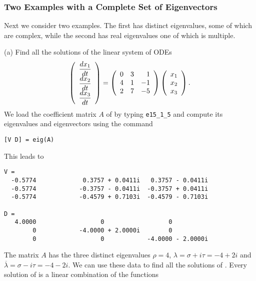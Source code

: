 \subsubsection*{Two Examples with a Complete Set of Eigenvectors}

Next we consider two examples.  The first has distinct eigenvalues, some 
of which are complex, while the second has real eigenvalues one of which is 
multiple.

\noindent (a)  Find all the solutions of the linear system of ODEs
\arraystart
\begin{equation*}  \label{eq:exsyslinc1}
\left(\begin{array}{c}
\displaystyle\frac{dx_1}{dt} \\ \displaystyle\frac{dx_2}{dt} \\ \displaystyle\frac{dx_3}{dt}
\end{array}\right)
=
\left(\begin{array}{rrr}
     0  &  3  &  1\\
     4  &  1  & -1\\
     2  &  7  & -5
\end{array}\right)
\left(\begin{array}{c}
x_1 \\ x_2 \\ x_3
\end{array}\right).
\end{equation*}
\arrayfinish
We load the coefficient matrix $A$ of  by typing 
{\tt e15\_1\_5} and compute its eigenvalues and eigenvectors using the 
command 
\begin{verbatim}
[V D] = eig(A)
\end{verbatim}
This leads to
\begin{verbatim}
V =
  -0.5774             0.3757 + 0.0411i   0.3757 - 0.0411i
  -0.5774            -0.3757 - 0.0411i  -0.3757 + 0.0411i
  -0.5774            -0.4579 + 0.7103i  -0.4579 - 0.7103i

D =
   4.0000                  0                  0
        0            -4.0000 + 2.0000i        0
        0                  0            -4.0000 - 2.0000i
\end{verbatim}
The matrix $A$ has the three distinct eigenvalues $\rho=4$,
$\lambda=\sigma+i\tau = -4+2i$ and $\overline\lambda=\sigma-i\tau
= -4-2i$.  We can use these data to find all the solutions of 
.  Every solution of  is a linear 
combination of the functions
